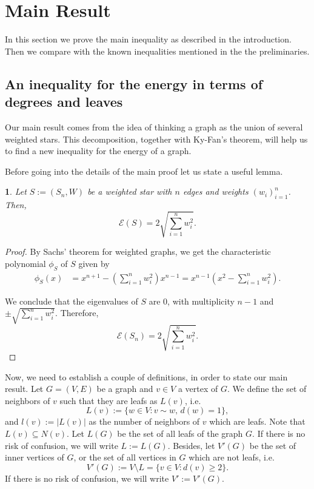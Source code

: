 \documentclass[a4paper]{article}
\newcommand{\abs}[1]{\left\lvert#1\right\rvert}
\newcommand{\energy}[1]{\mathcal{E}\left(#1\right)}
\theoremstyle{plain}
\newtheorem{lemma}{\protect\lemmaname}
\renewcommand{\lemmaname}{Lemma}
\renewcommand{\lemmaname}{Lema}
\begin{document}
\section{Main Result} \label{result_section}
In this section we prove the main inequality as described in the introduction. Then we compare with the known inequalities mentioned in the the preliminaries.
\subsection{An inequality for the energy in terms of degrees and leaves}

Our main result comes from the idea of thinking a graph as the union of several weighted stars. This decomposition, together with Ky-Fan's theorem, will help us to find a new inequality for the energy of a graph.  

Before going into the details of the main proof let us state a useful lemma.

\begin{lemma}\label{lema:weighedstar}
Let $S:=(S_n,W)$ be a weighted star with $n$ edges and weights $(w_{i})_{i = 1}^n$. Then,
$$\mathcal{E}(S) = 2\sqrt{\sum_{i = 1}^n w_i^2}.$$

\end{lemma}

\begin{proof}
By Sachs' theorem for weighted graphs, we get the characteristic polynomial $\phi_S$ of \(S\) given by
\begin{align*}
    \phi_{S}(x) &= x^{n + 1} - \left(\sum_{i = 1}^n w_i^2\right)x^{n - 1} = x^{n - 1}\left(x^2 - \sum_{i = 1}^n w_i^2\right).
\end{align*}
    
We conclude that the eigenvalues of \(S\) are 0, with multiplicity $n-1$ and \(\pm\sqrt{\sum_{i = 1}^n w_i^2}\). Therefore,
\[
    \energy{S_n} = 2\sqrt{\sum_{i = 1}^n w_i^2}.
\]
    
\end{proof}
Now, we need to establish a couple of definitions, in order to state our main result.
Let \(G = (V, E)\) be a graph and \(v \in V\) a vertex of \(G\). We define the set of neighbors of \(v\) such that they are leafs as \(L(v)\), i.e.
\[
    L(v) := \{w \in V : v \sim w,\, d(w) = 1\},
\] 
and \(l(v) := \abs{L(v)}\) as the number of neighbors of \(v\) which are leafs. Note that \(L(v) \subseteq N(v)\). Let \(L(G)\) be the set of all leafs of the graph \(G\). If there is no risk of confusion, we will write $L := L(G)$. Besides, let \(V'(G)\) be the set of inner vertices of \(G\), or the set of all vertices in \(G\) which are not leafs, i.e.
\[
    V'(G) := V \setminus L = \{v \in V : d(v) \geq 2\}.
\]
If there is no risk of confusion, we will write \(V' := V'(G)\).
\end{document}
